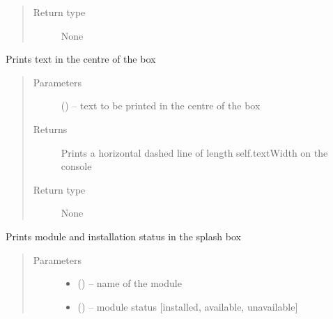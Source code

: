 \documentclass[letterpaper,10pt,english]{sphinxmanual}
\begin{document}
\begin{fulllineitems}
\begin{fulllineitems}
\begin{quote}
\begin{description}
\item[{Return type}] \leavevmode
None

\end{description}\end{quote}

\end{fulllineitems}


\begin{fulllineitems}
\label{\detokenize{MouseReferenceManual:MOUSE.SplashScreen.printInBox}}
Prints text in the centre of the box
\begin{quote}\begin{description}
\item[{Parameters}] \leavevmode
{} () -- text to be printed in the centre of the box

\item[{Returns}] \leavevmode
Prints a horizontal dashed line of length self.textWidth on the console

\item[{Return type}] \leavevmode
None

\end{description}\end{quote}

\end{fulllineitems}


\begin{fulllineitems}
\label{\detokenize{MouseReferenceManual:MOUSE.SplashScreen.printModule}}
Prints module and installation status in the splash box
\begin{quote}\begin{description}
\item[{Parameters}] \leavevmode\begin{itemize}
\item {} 
 () -- name of the module

\item {} 
 () -- module status {[}installed, available, unavailable{]}


\end{itemize}
\end{description}
\end{quote}
\end{fulllineitems}
\end{fulllineitems}
\end{document}
